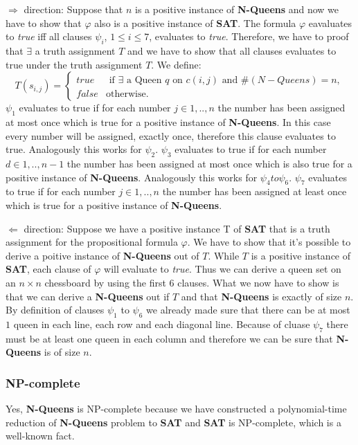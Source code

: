 $\Rightarrow $ direction:\newline
Suppose that $n$ is a positive instance of \textbf{N-Queens} and now we have
to show that $\varphi $ also is a positive instance of \textbf{SAT}.\newline
The formula $\varphi $ eavaluates to \textit{true} iff all clauses $\psi _{i}
$, $1\leq i\leq 7$, evaluates to \textit{true}. Therefore, we have to proof
that $\exists $ a truth assignment $T$ and we have to show that all clauses
evaluates to true under the truth assignment $T$. We define:\newline
\begin{equation*}
T(s_{i,j})=\left\{ 
\begin{array}{cl}
true & \text{ if }\exists \text{ a Queen }q\text{ on }c(i,j)\text{ and }%
\#(N-Queens)=n, \\ 
false & \text{otherwise.}%
\end{array}%
\right. 
\end{equation*}%
$\psi _{1}$ evaluates to true if for each number $j\in {1,..,n}$ the number
has been assigned at most once which is true for a positive instance of 
\textbf{N-Queens}. In this case every number will be assigned, exactly once,
therefore this clause evaluates to true.\newline
Analogously this works for $\psi _{2}$.\newline
$\psi _{3}$ evaluates to true if for each number $d\in {1,..,n-1}$ the
number has been assigned at most once which is also true for a positive
instance of \textbf{N-Queens}.\newline
Analogously this works for $\psi _{4}to\psi _{6}$.\newline
$\psi _{7}$ evaluates to true if for each number $j\in {1,..,n}$ the number
has been assigned at least once which is true for a positive instance of 
\textbf{N-Queens}.\newline

\noindent $\Leftarrow $ direction:\newline
Suppose we have a positive instance T of \textbf{SAT} that is a truth
assignment for the propositional formula $\varphi $. We have to show that
it's possible to derive a poitive instance of \textbf{N-Queens} out of $T$.%
\newline
While $T$ is a positive instance of \textbf{SAT}, each clause of $\varphi $
will evaluate to \textit{true}. Thus we can derive a queen set on an $%
n\times n$ chessboard by using the first 6 clauses. What we now have to show
is that we can derive a \textbf{N-Queens} out if $T$ and that \textbf{%
N-Queens} is exactly of size $n$.\newline
By definition of clauses $\psi _{1}$ to $\psi _{6}$ we already made sure
that there can be at most $1$ queen in each line, each row and each diagonal
line. Because of cluase $\psi _{7}$ there must be at least one queen in each
column and therefore we can be sure that \textbf{N-Queens} is of size $n$.

\subsubsection{NP-complete}

Yes, \textbf{N-Queens} is NP-complete because we have constructed a
polynomial-time reduction of \textbf{N-Queens} problem to \textbf{SAT} and 
\textbf{SAT} is NP-complete, which is a well-known fact.

\bigskip
